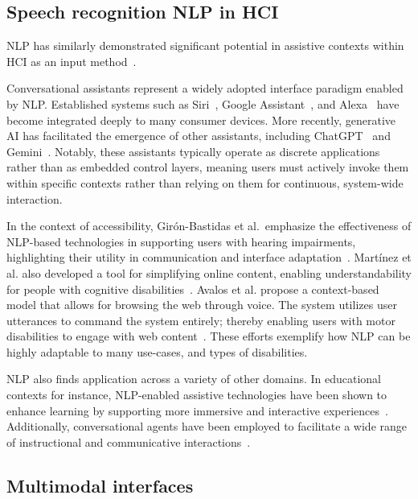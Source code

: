 \subsection{Speech recognition NLP in HCI}

\ac{NLP} has similarly demonstrated significant potential in assistive contexts within HCI as an input method~\cite{song2024review}. 

Conversational assistants represent a widely adopted interface paradigm enabled by NLP. Established systems such as Siri~\cite{apple_siri}, Google Assistant~\cite{google_assistant}, and Alexa~\cite{amazon_alexa} have become integrated deeply to many consumer devices. More recently, generative AI has facilitated the emergence of other assistants, including ChatGPT~\cite{openai_chatgpt} and Gemini~\cite{google_gemini}. Notably, these assistants typically operate as discrete applications rather than as embedded control layers, meaning users must actively invoke them within specific contexts rather than relying on them for continuous, system-wide interaction.

In the context of accessibility, Girón-Bastidas et al.\ emphasize the effectiveness of NLP-based technologies in supporting users with hearing impairments, highlighting their utility in communication and interface adaptation~\cite{gironbastidas2019nlp}. Martínez et al. also developed a tool for simplifying online content, enabling understandability for people with cognitive disabilities~\cite{martinez2024tool}. Avalos et al. propose a context-based model that allows for browsing the web through voice. The system utilizes user utterances to command the system entirely; thereby enabling users with motor disabilities to engage with web content~\cite{avalos2025context}. These efforts exemplify how NLP can be highly adaptable to many use-cases, and types of disabilities.

NLP also finds application across a variety of other domains. In educational contexts for instance, NLP-enabled assistive technologies have been shown to enhance learning by supporting more immersive and interactive experiences~\cite{terzopoulos2020voice}. Additionally, conversational agents have been employed to facilitate a wide range of instructional and communicative interactions~\cite{liu2024chatgpt}.

\subsection{Multimodal interfaces}

